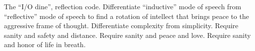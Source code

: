

The ``I/O dine'', reflection code.  Differentiate ``inductive'' mode
of \break speech from ``reflective'' mode of speech to find a rotation of
intellect that brings peace to the aggressive frame of thought.
Differentiate complexity from simplicity.  Require sanity and safety
and distance.  Require sanity and peace and love.  Require sanity and
honor of life in breath.

\bye
